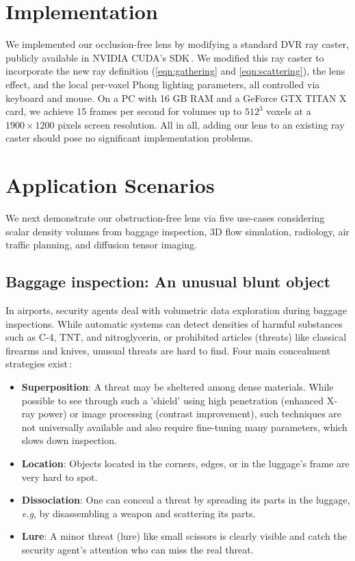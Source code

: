 \section{Implementation}
\label{sec:implem}
%
We implemented our occlusion-free lens by modifying a standard DVR ray caster, publicly available in NVIDIA CUDA's SDK\,\cite{cudasdk}. We modified this ray caster to incorporate the new ray definition (\autoref{eqn:gathering} and \autoref{eqn:scattering}), the lens effect, and the local per-voxel Phong lighting parameters, all controlled via keyboard and mouse. On a PC with 16 GB RAM and a GeForce GTX TITAN X card, we achieve 15 frames per second for volumes up to $512^3$ voxels at a $1900 \times 1200$ pixels screen resolution. All in all, adding our lens to an existing ray caster should pose no significant implementation problems.

\section{Application Scenarios}
\label{sec:scenarios}
%
We next demonstrate our obstruction-free lens via five use-cases considering scalar density volumes from baggage inspection, 3D flow simulation, radiology, air traffic planning, and diffusion tensor imaging.

\subsection{Baggage inspection: An unusual blunt object}
\label{sec:baggage}
%
In airports, security agents deal with volumetric data exploration during baggage inspections. While automatic systems can detect densities of harmful substances such as C-4, TNT, and nitroglycerin, or prohibited articles (threats) like classical firearms and knives, unusual threats are hard to find. Four main concealment strategies exist\,\cite{7819413}:
\begin{itemize}
\item \textbf{Superposition}: A threat may be sheltered among dense materials. While possible to see through such a 'shield' using high penetration (enhanced X-ray power) or image processing (contrast improvement), such techniques are not universally available and also require fine-tuning many parameters, which slows down inspection.


\item \textbf{Location}: Objects located in the corners, edges, or in the luggage's frame are very hard to spot.


\item \textbf{Dissociation}: One can conceal a threat by spreading its parts in the luggage, \emph{e.g}, by disassembling a weapon and scattering its parts.

\item \textbf{Lure}: A minor threat (lure) like small scissors is clearly visible and catch the security agent's attention who can miss the real threat.

\end{itemize}


